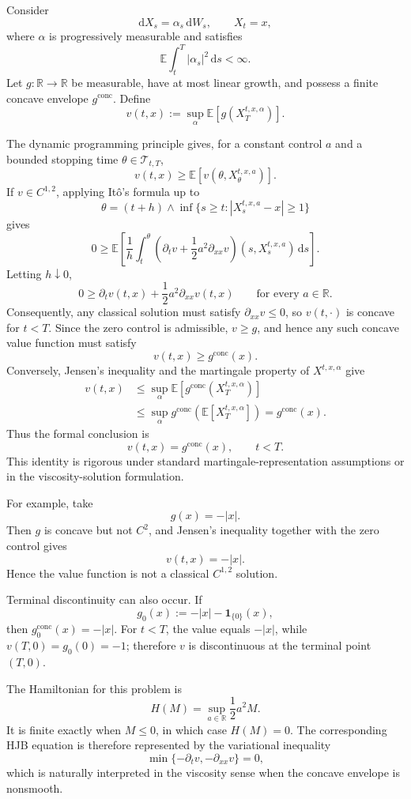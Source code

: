 Consider
\[
\mathrm dX_s=\alpha_s\,\mathrm dW_s,
\qquad X_t=x,
\]
where \(\alpha\) is progressively measurable and satisfies
\[
\mathbb E\int_t^T|\alpha_s|^2\,\mathrm ds<\infty.
\]
Let \(g:\mathbb R\to\mathbb R\) be measurable, have at most linear growth, and possess a finite concave envelope \(g^{\operatorname{conc}}\). Define
\[
v(t,x)
:=\sup_\alpha\mathbb E[g(X_T^{t,x,\alpha})].
\]

The dynamic programming principle gives, for a constant control \(a\) and a bounded stopping time \(\theta\in\mathcal T_{t,T}\),
\[
v(t,x)\ge\mathbb E[v(\theta,X_\theta^{t,x,a})].
\]
If \(v\in C^{1,2}\), applying It\^o's formula up to
\[
\theta=(t+h)\wedge
\inf\{s\ge t:|X_s^{t,x,a}-x|\ge1\}
\]
gives
\[
0\ge
\mathbb E\!\left[
\frac1h\int_t^\theta
\left(
\partial_tv
+\frac12a^2\partial_{xx}v
\right)(s,X_s^{t,x,a})\,\mathrm ds
\right].
\]
Letting \(h\downarrow0\),
\[
0\ge
\partial_tv(t,x)
+\frac12a^2\partial_{xx}v(t,x)
\qquad\text{for every }a\in\mathbb R.
\]
Consequently, any classical solution must satisfy \(\partial_{xx}v\le0\), so \(v(t,\cdot)\) is concave for \(t<T\). Since the zero control is admissible, \(v\ge g\), and hence any such concave value function must satisfy
\[
v(t,x)\ge g^{\operatorname{conc}}(x).
\]
Conversely, Jensen's inequality and the martingale property of \(X^{t,x,\alpha}\) give
\[
\begin{aligned}
v(t,x)
&\le\sup_\alpha
\mathbb E[g^{\operatorname{conc}}(X_T^{t,x,\alpha})]\\
&\le\sup_\alpha
g^{\operatorname{conc}}(\mathbb E[X_T^{t,x,\alpha}])
=g^{\operatorname{conc}}(x).
\end{aligned}
\]
Thus the formal conclusion is
\[
v(t,x)=g^{\operatorname{conc}}(x),
\qquad t<T.
\]
This identity is rigorous under standard martingale-representation assumptions or in the viscosity-solution formulation.

For example, take
\[
g(x)=-|x|.
\]
Then \(g\) is concave but not \(C^2\), and Jensen's inequality together with the zero control gives
\[
v(t,x)=-|x|.
\]
Hence the value function is not a classical \(C^{1,2}\) solution.

Terminal discontinuity can also occur. If
\[
g_0(x):=-|x|-\mathbf1_{\{0\}}(x),
\]
then \(g_0^{\operatorname{conc}}(x)=-|x|\). For \(t<T\), the value equals \(-|x|\), while \(v(T,0)=g_0(0)=-1\); therefore \(v\) is discontinuous at the terminal point \((T,0)\).

The Hamiltonian for this problem is
\[
H(M)=\sup_{a\in\mathbb R}\frac12a^2M.
\]
It is finite exactly when \(M\le0\), in which case \(H(M)=0\). The corresponding HJB equation is therefore represented by the variational inequality
\[
\min\{-\partial_tv,-\partial_{xx}v\}=0,
\]
which is naturally interpreted in the viscosity sense when the concave envelope is nonsmooth.
